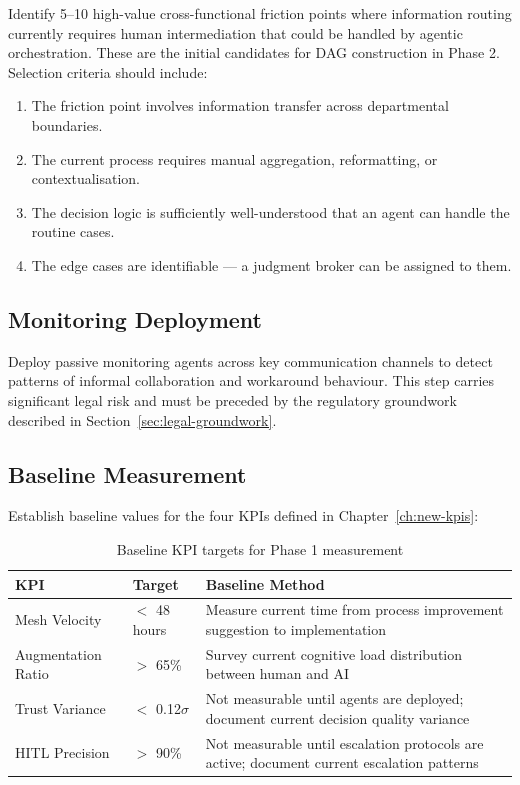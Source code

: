 Identify 5--10 high-value cross-functional friction points where information routing currently requires human intermediation that could be handled by agentic orchestration. These are the initial candidates for DAG construction in Phase 2. Selection criteria should include:

\begin{enumerate}
  \item The friction point involves information transfer across departmental boundaries.
  \item The current process requires manual aggregation, reformatting, or contextualisation.
  \item The decision logic is sufficiently well-understood that an agent can handle the routine cases.
  \item The edge cases are identifiable --- a judgment broker can be assigned to them.
\end{enumerate}

\subsection{Monitoring Deployment}

Deploy passive monitoring agents across key communication channels to detect patterns of informal collaboration and workaround behaviour. This step carries significant legal risk and must be preceded by the regulatory groundwork described in Section~\ref{sec:legal-groundwork}.

\subsection{Baseline Measurement}

Establish baseline values for the four KPIs defined in Chapter~\ref{ch:new-kpis}:

\begin{table}[h]
\centering
\caption{Baseline KPI targets for Phase 1 measurement}
\label{tab:baseline-kpis}
\begin{tabularx}{\textwidth}{l l X}
\toprule
\textbf{KPI} & \textbf{Target} & \textbf{Baseline Method} \\
\midrule
Mesh Velocity & $<$ 48 hours & Measure current time from process improvement suggestion to implementation \\
\addlinespace
Augmentation Ratio & $>$ 65\% & Survey current cognitive load distribution between human and AI \\
\addlinespace
Trust Variance & $<$ 0.12$\sigma$ & Not measurable until agents are deployed; document current decision quality variance \\
\addlinespace
HITL Precision & $>$ 90\% & Not measurable until escalation protocols are active; document current escalation patterns \\
\bottomrule
\end{tabularx}
\end{table}

